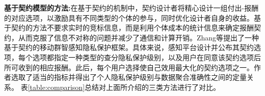 \noindent\textbf{基于契约模型的方法:}在基于契约的机制中，契约设计者将精心设计一组付出-报酬的对应选项，以激励具有不同类型的个体的参与，同时优化设计者自身的收益。基于契约的方法不要求实时的竞标信息，而是利用个体成本的统计信息来确定报酬契约，从而克服了信息不对称的问题并减少了通信和计算开销。Zhang等\cite{Kun1}提出了一种基于契约的移动群智感知隐私保护框架。具体来说，感知平台设计并公布其契约选项，每个选项都指定一种类型的查分隐私保护级别，以及用户在同意该契约选项后所可收到的相应报酬。此后，每个用户选择使自己效用最大化的契约选项之一。作者选取了适当的指标并得出了个人隐私保护级别与数据聚合准确性之间的定量关系。
表\ref{table:comparison}总结对上面所介绍的三类方法进行了对比。

